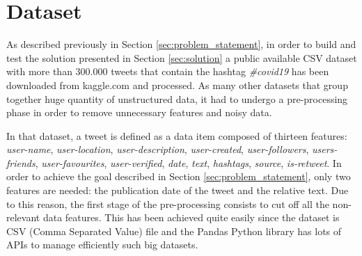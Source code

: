 \section{Dataset}
\label{sec:dataset}
As described previously in Section \ref{sec:problem_statement}, in order to build and test the solution presented in Section \ref{sec:solution} a public available CSV dataset with more than 300.000 tweets that contain the hashtag \textit{\#covid19} \cite{covid19-tweets-dataset} has been downloaded from kaggle.com and processed. As many other datasets that group together huge quantity of unstructured data, it had to undergo a pre-processing phase in order to remove unnecessary features and noisy data. 

In that dataset, a tweet is defined as a data item composed of thirteen features: \textit{user-name}, \textit{user-location}, \textit{user-description}, \textit{user-created}, \textit{user-followers}, \textit{users-friends}, \textit{user-favourites}, \textit{user-verified}, \textit{date}, \textit{text}, \textit{hashtags}, \textit{source}, \textit{is-retweet}. In order to achieve the goal described in Section \ref{sec:problem_statement}, only two features are needed: the publication date of the tweet and the relative text. Due to this reason, the first stage of the pre-processing consists to cut off all the non-relevant data features. This has been achieved quite easily since the dataset is CSV (Comma Separated Value) file and the Pandas Python library \cite{python-pandas} has lots of APIs to manage efficiently such big datasets.

